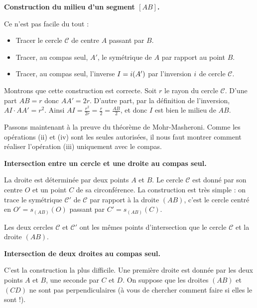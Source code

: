 \documentclass[11pt,class=report,crop=false]{standalone}
\begin{document}
\bigskip
\textbf{Construction du milieu d'un segment $[AB]$.}

Ce n'est pas facile du tout :
\begin{itemize}
  \item Tracer le cercle $\mathcal{C}$ de centre $A$ passant par $B$.
  \item Tracer, au compas seul, $A'$, le symétrique de $A$ par rapport au point $B$.
  \item Tracer, au compas seul, l'inverse $I = i(A')$ par l'inversion $i$ de cercle $\mathcal{C}$.
\end{itemize}


Montrons que cette construction est correcte. 
Soit $r$ le rayon du cercle $\mathcal{C}$. 
D'une part $AB=r$ donc $AA' = 2r$.
D'autre part, par la définition de l'inversion, $AI \cdot AA' = r^2$. 
Ainsi $AI = \frac{r^2}{2r} = \frac{r}{2} = \frac{AB}{2}$, et donc $I$ est bien le milieu de $AB$.


\bigskip

Passons maintenant à la preuve du théorème de Mohr-Masheroni.
Comme les opérations (ii) et (iv) sont les seules autorisées, il nous faut montrer comment réaliser 
l'opération (iii) uniquement avec le compas.

\bigskip

\textbf{Intersection entre un cercle et une droite au compas seul.}

La droite est déterminée par deux points $A$ et $B$.
Le cercle $\mathcal{C}$ est donné par son centre $O$ et un point $C$ de sa circonférence.
La construction est très simple : on trace le symétrique $\mathcal{C'}$ de $\mathcal{C}$
par rapport à la droite $(AB)$, c'est le cercle centré en $O'=s_{(AB)}(O)$ passant par 
$C'=s_{(AB)}(C)$.

Les deux cercles $\mathcal{C}$ et $\mathcal{C'}$ ont les mêmes points d'intersection
que le cercle $\mathcal{C}$ et la droite $(AB)$.





\bigskip

\textbf{Intersection de deux droites au compas seul.}

C'est la construction la plus difficile.
Une première droite est donnée par les deux points $A$ et $B$, une seconde par $C$ et $D$.
On suppose que les droites $(AB)$ et $(CD)$ ne sont pas perpendiculaires (à vous de chercher comment faire si elles le sont !).
\end{document}
